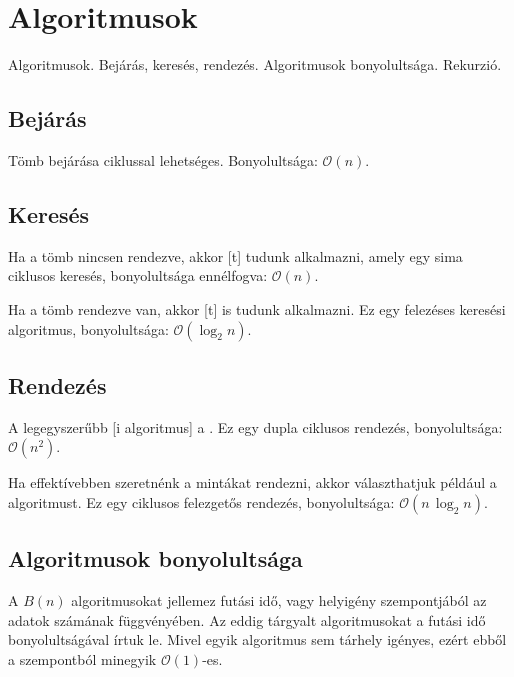 \documentclass[../../main.tex]{subfiles}
\begin{document}
\section{Algoritmusok}

\begin{fulltheorem}
  Algoritmusok. Bejárás, keresés, rendezés.
  Algoritmusok bonyolultsága. Rekurzió.
\end{fulltheorem}

\subsection{Bejárás}

Tömb bejárása  ciklussal lehetséges. Bonyolultsága: $\mathcal{O}(n)$.

\subsection{Keresés}

Ha a tömb nincsen rendezve, akkor [t] tudunk
alkalmazni, amely egy sima  ciklusos keresés, bonyolultsága
ennélfogva: $\mathcal{O}(n)$.

Ha a tömb rendezve van, akkor [t] is tudunk alkalmazni.
Ez egy felezéses keresési algoritmus, bonyolultsága: $\mathcal{O}(\log_2n)$.

\subsection{Rendezés}

A legegyszerűbb [i algoritmus] a .
Ez egy dupla  ciklusos rendezés, bonyolultsága: $\mathcal{O}(n^2)$.

Ha effektívebben szeretnénk a mintákat rendezni, akkor választhatjuk
például a  algoritmust. Ez egy  ciklusos felezgetős
rendezés, bonyolultsága: $\mathcal{O}(n \, \log_2n)$.

\subsection{Algoritmusok bonyolultsága}

A $B(n)$  algoritmusokat jellemez futási idő, vagy
helyigény szempontjából az adatok számának függvényében. Az eddig tárgyalt
algoritmusokat a futási idő bonyolultságával írtuk le. Mivel egyik
algoritmus sem tárhely igényes, ezért ebből a szempontból minegyik
$\mathcal{O}(1)$-es.
\end{document}
